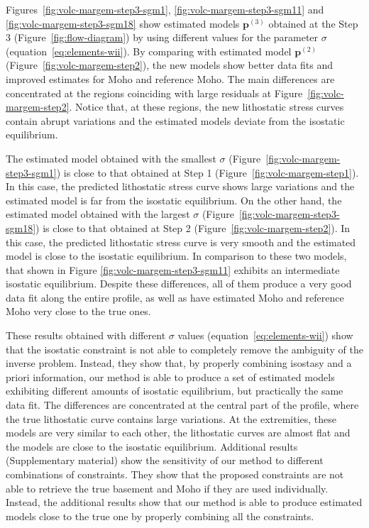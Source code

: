 \documentclass[manuscript,revised]{geophysics}
\begin{document}
Figures~\ref{fig:volc-margem-step3-sgm1}, \ref{fig:volc-margem-step3-sgm11} and 
\ref{fig:volc-margem-step3-sgm18} show estimated models $\mathbf{p}^{(3)}$ obtained at
the Step 3 (Figure~\ref{fig:flow-diagram}) by using different values for the parameter 
$\sigma$ (equation~\ref{eq:elements-wii}).
By comparing with estimated model $\mathbf{p}^{(2)}$
(Figure~\ref{fig:volc-margem-step2}), the new models 
show better data fits and improved estimates for Moho and reference Moho.
The main differences are concentrated at the regions coinciding with
large residuals at Figure~\ref{fig:volc-margem-step2}.
Notice that, at these regions, the new lithostatic stress curves contain abrupt
variations and the estimated models deviate from the isostatic equilibrium.

The estimated model obtained with the smallest $\sigma$ 
(Figure~\ref{fig:volc-margem-step3-sgm1}) is close to that 
obtained at Step 1 (Figure~\ref{fig:volc-margem-step1}).
In this case, the predicted lithostatic stress curve shows large variations 
and the estimated model is far from the isostatic equilibrium.
On the other hand, the estimated model obtained with 
the largest $\sigma$ (Figure~\ref{fig:volc-margem-step3-sgm18}) is close to that 
obtained at Step 2 (Figure~\ref{fig:volc-margem-step2}).
In this case, the predicted lithostatic stress curve is very smooth and the 
estimated model is close to the isostatic equilibrium.
In comparison to these two models, that shown in Figure 
\ref{fig:volc-margem-step3-sgm11} exhibits an intermediate isostatic equilibrium.
Despite these differences, all of them produce a very good data fit along the 
entire profile, as well as have estimated Moho and reference Moho very close to the 
true ones. 

These results obtained with different $\sigma$ values (equation~\ref{eq:elements-wii})
show that the isostatic constraint is not able to completely
remove the ambiguity of the inverse problem. Instead, they show that, by properly
combining isostasy and a priori information, our method is able to
produce a set of estimated models exhibiting different 
amounts of isostatic equilibrium, but practically the same data fit. 
The differences are concentrated at the central part of the profile, where the
true lithostatic curve contains large variations. At the extremities, these models
are very similar to each other, the lithostatic curves are almost flat 
and the models are close to the isostatic equilibrium.
Additional results (Supplementary material) show the sensitivity of our
method to different combinations of constraints. They show that the proposed constraints 
are not able to retrieve the true basement and Moho if they are used individually.
Instead, the additional results show that our method is able to produce estimated models 
close to the true one by properly combining all the constraints.
\end{document}
